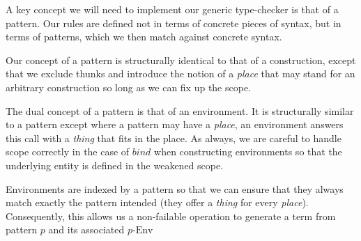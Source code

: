 
A key concept we will need to implement our generic type-checker is that of a
pattern. Our
rules are defined not in terms of concrete pieces of syntax, but in terms of
patterns, which we then match against concrete syntax.

Our concept of a pattern is structurally identical to that of a construction,
except that we exclude thunks and introduce the notion of a \emph{place} that
may stand for an arbitrary construction so long as we can fix up the scope.

The dual concept of a pattern is that of an environment. It is structurally
similar to a pattern except where a pattern may have a \emph{place}, an
environment answers this call with a \emph{thing} that fits in the place.
As always, we are careful to handle scope correctly in the case of $bind$
when constructing environments so that the underlying entity is defined in
the weakened scope.

Environments are indexed by a pattern so that we can ensure that they always
match exactly the pattern intended (they offer a \emph{thing} for every
\emph{place}). Consequently, this allows us a non-failable operation to
generate a term from pattern $p$ and its associated $p\mbox{-Env}$

